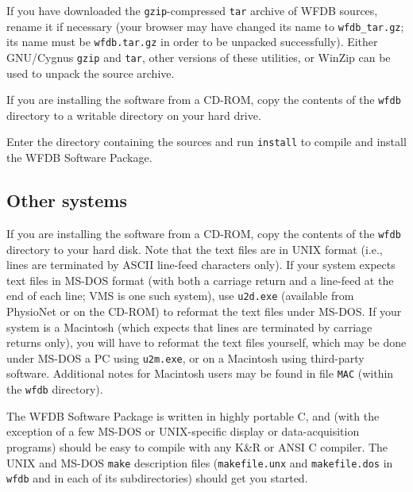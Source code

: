 \documentclass[twoside]{article}
\begin{document}
If you have downloaded the {\tt gzip}-compressed {\tt tar} archive of WFDB
sources, rename it if necessary (your browser may have changed its name to
{\tt wfdb\_tar.gz};  its name must be {\tt wfdb.tar.gz} in order to be
unpacked successfully).  Either GNU/Cygnus {\tt gzip} and {\tt tar}, other
versions of these utilities, or WinZip can be used to unpack the source
archive.

If you are installing the software from a CD-ROM, copy the contents of the
{\tt wfdb} directory to a writable directory on your hard drive.

Enter the directory containing the sources and run {\tt install} to compile
and install the WFDB Software Package.

\subsection*{Other systems}

If you are installing the software from a CD-ROM, copy the contents of the
{\tt wfdb} directory to your hard disk.  Note that the text files are in
UNIX format (i.e., lines are terminated by ASCII line-feed characters only).
If your system expects text files in MS-DOS format (with both a carriage return
and a line-feed at the end of each line; VMS is one such system), use
{\tt u2d.exe} (available from PhysioNet or on the CD-ROM) to reformat the
text files under MS-DOS.  If your system is a Macintosh (which expects that
lines are terminated by carriage returns only), you will have to reformat the
text files yourself, which may be done under MS-DOS a PC using {\tt u2m.exe},
or on a Macintosh using third-party software.  Additional notes for Macintosh
users may be found in file {\tt MAC} (within the {\tt wfdb} directory).

The WFDB Software Package is written in highly portable C, and (with the
exception of a few MS-DOS or UNIX-specific display or data-acquisition
programs) should be easy to compile with any K\&R or ANSI C compiler.
The UNIX and MS-DOS {\tt make} description files ({\tt makefile.unx}
and {\tt makefile.dos} in {\tt wfdb} and in each of its subdirectories)
should get you started.
\end{document}
